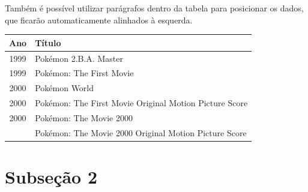     Também é possível utilizar parágrafos dentro da tabela para posicionar os dados, que ficarão automaticamente alinhados à esquerda.
    \begin{table}[htb]
        {%
            \begin{tabular}{cp{13.0cm}}
                \toprule
                \textbf{Ano}    & \textbf{Título}                                           \\
                \midrule\midrule
                1999            & Pokémon 2.B.A. Master                                     \\
                1999            & Pokémon: The First Movie                                  \\
                2000            & Pokémon World                                             \\
                2000            & Pokémon: The First Movie Original Motion Picture Score    \\
                2000            & Pokémon: The Movie 2000                                   \\
                & Pokémon: The Movie 2000 Original Motion Picture Score     \\
                \bottomrule
            \end{tabular}
        }
        {%
        }
    \end{table}




\section[Subseção 2]{Subseção 2}\label{sec:introducao-subsecao2}
    \lipsum[1]

